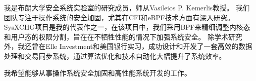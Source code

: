 
\begin{cvparagraph}
    我是布朗大学安全系统实验室的研究成员，师从Vasileios P. Kemerlis教授。
    我们团队专注于操作系统的安全加固，尤其在CFI和eBPF技术方面有深入研究。
    SysXCHG项目是我的代表作之一，在该项目中，我们采用BPF来精细调整内核态和用户态的权限分割，旨在在不牺牲性能的情况下加强系统安全。
    除学术研究外，我还曾在Elle Investment和美国银行实习，成功设计和开发了一套高效的数据处理和交易同步系统，通过算法优化和技术自动化大幅提升了系统效率。
    
    我希望能够从事操作系统安全加固和高性能系统开发的工作。
\end{cvparagraph}
